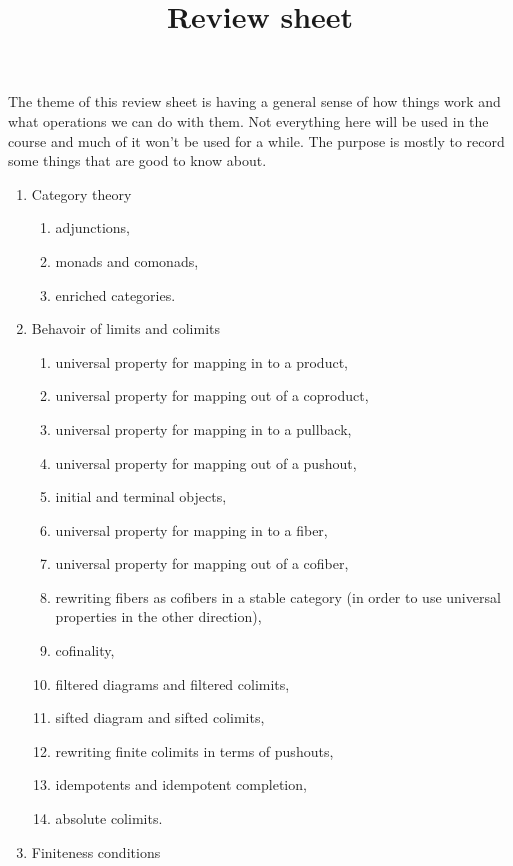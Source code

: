\documentclass{amsart}
\title{Review sheet}
\begin{document}
\maketitle

The theme of this review sheet is having a general sense of how things work and what operations we can do with them.
Not everything here will be used in the course and much of it won't be used for a while.
The purpose is mostly to record some things that are good to know about.

\begin{enumerate}
\item Category theory
  \begin{enumerate}
  \item adjunctions,
  \item monads and comonads,
  \item enriched categories.    
  \end{enumerate}
\item Behavoir of limits and colimits
  \begin{enumerate}    
  \item universal property for mapping in to a product,
  \item universal property for mapping out of a coproduct,
  \item universal property for mapping in to a pullback,
  \item universal property for mapping out of a pushout,
  \item initial and terminal objects,
  \item universal property for mapping in to a fiber,
  \item universal property for mapping out of a cofiber,
  \item rewriting fibers as cofibers in a stable category
    (in order to use universal properties in the other direction),
  \item cofinality,
  \item filtered diagrams and filtered colimits,
  \item sifted diagram and sifted colimits,
  \item rewriting finite colimits in terms of pushouts,
  \item idempotents and idempotent completion,
  \item absolute colimits.
  \end{enumerate}
\item Finiteness conditions
  \begin{enumerate}

\end{enumerate}
\end{enumerate}
\end{document}
